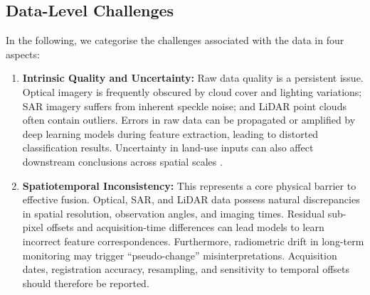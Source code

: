 \documentclass[]{interact}
\theoremstyle{plain}%
\theoremstyle{definition}
\theoremstyle{remark}
\DeclareRobustCommand{\DIFadd}[1]{{\protect\color{DIFaddcolor}\uwave{#1}}}
\DeclareRobustCommand{\DIFdel}[1]{{\protect\color{DIFdelcolor}\sout{#1}}}
\def\DIFadd#1{#1}%
\def\DIFdel#1{}%
\begin{document}
\subsection{Data-Level Challenges}

In the following, we \DIFdel{categorize} \DIFadd{categorise} the challenges associated \DIFdel{to} \DIFadd{with} the data in \DIFdel{three} \DIFadd{four} aspects:

\begin{enumerate}
	\item \textbf{Intrinsic Quality and Uncertainty:} Raw data quality is a persistent issue. Optical imagery is frequently obscured by cloud cover and lighting variations; SAR imagery suffers from inherent speckle noise; and LiDAR point clouds often contain outliers. \DIFdel{Deep} \DIFdel{learning} \DIFdel{models}\DIFdel{,} \DIFdel{particularly} \DIFdel{Transformer}\DIFdel{,} \DIFdel{are} \DIFdel{highly} \DIFdel{sensitive} \DIFdel{to} \DIFdel{noise}\DIFdel{,} \DIFdel{and} \DIFdel{errors} \DIFadd{Errors} in raw data can be \DIFadd{propagated} \DIFadd{or} amplified \DIFadd{by} \DIFadd{deep} \DIFadd{learning} \DIFadd{models} during feature extraction, leading to distorted classification results\DIFadd{.} \DIFadd{Uncertainty} \DIFadd{in} \DIFadd{land-use} \DIFadd{inputs} \DIFadd{can} \DIFadd{also} \DIFadd{affect} \DIFadd{downstream} \DIFadd{conclusions} \DIFadd{across} \DIFadd{spatial} \DIFadd{scales} {\color{blue}\citep{li2026landuncertainty}}.
	\item \textbf{Spatiotemporal Inconsistency:} This represents a core physical barrier to effective fusion. Optical, SAR, and LiDAR data possess natural discrepancies in spatial resolution, observation angles, and imaging times. \DIFdel{Existing} \DIFdel{registration} \DIFdel{algorithms} \DIFdel{struggle} \DIFdel{to} \DIFdel{eliminate} \DIFadd{Residual} sub-pixel offsets\DIFdel{,} and \DIFdel{such} \DIFdel{spatial} \DIFdel{misalignments} \DIFadd{acquisition-time} \DIFadd{differences} can lead models to learn incorrect feature correspondences. Furthermore, radiometric drift in long-term monitoring may trigger ``pseudo-change'' misinterpretations. \DIFadd{Acquisition} \DIFadd{dates}\DIFadd{,} \DIFadd{registration} \DIFadd{accuracy}\DIFadd{,} \DIFadd{resampling}\DIFadd{,} \DIFadd{and} \DIFadd{sensitivity} \DIFadd{to} \DIFadd{temporal} \DIFadd{offsets} \DIFadd{should} \DIFadd{therefore} \DIFadd{be} \DIFadd{reported}\DIFadd{.}

\end{enumerate}
\end{document}
